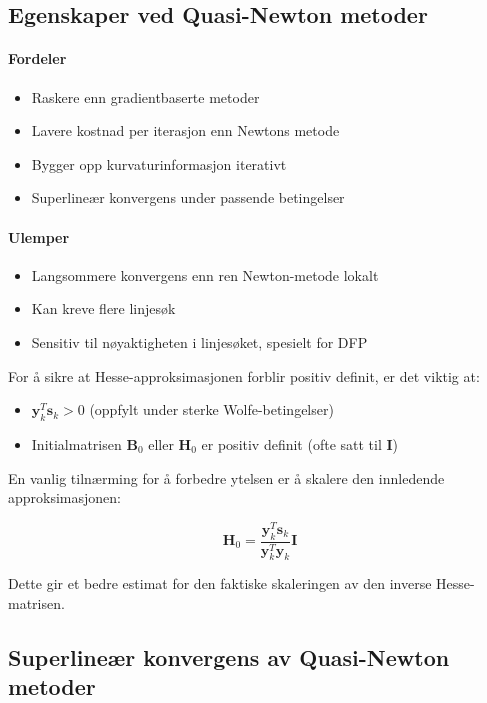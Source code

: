 \subsection{Egenskaper ved Quasi-Newton metoder}

\paragraph{Fordeler}
\begin{itemize}
	\item Raskere enn gradientbaserte metoder
	\item Lavere kostnad per iterasjon enn Newtons metode
	\item Bygger opp kurvaturinformasjon iterativt
	\item Superlineær konvergens under passende betingelser
\end{itemize}

\paragraph{Ulemper}
\begin{itemize}
	\item Langsommere konvergens enn ren Newton-metode lokalt
	\item Kan kreve flere linjesøk
	\item Sensitiv til nøyaktigheten i linjesøket, spesielt for DFP
\end{itemize}


For å sikre at Hesse-approksimasjonen forblir positiv definit, er det viktig at:

\begin{itemize}
	\item \(\symbf{y}_k^T\symbf{s}_k > 0\) (oppfylt under sterke Wolfe-betingelser)
	\item Initialmatrisen \(\symbf{B}_0\) eller \(\symbf{H}_0\) er positiv definit (ofte satt til \(\symbf{I}\))
\end{itemize}

En vanlig tilnærming for å forbedre ytelsen er å skalere den innledende approksimasjonen:

\[
	\symbf{H}_0 = \frac{\symbf{y}_k^T\symbf{s}_k}{\symbf{y}_k^T\symbf{y}_k}\symbf{I}
\]

Dette gir et bedre estimat for den faktiske skaleringen av den inverse Hesse-matrisen.

\subsection{Superlineær konvergens av Quasi-Newton metoder}


